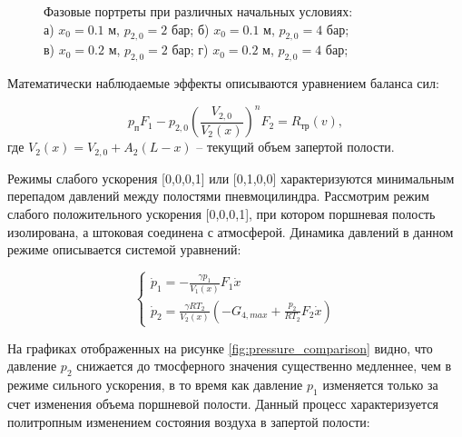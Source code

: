 \begin{figure}[htbp]
	\caption{Фазовые портреты при различных начальных условиях: \\
		а) $x_0 = \num{0,1}$ м, $p_{2,0} = 2$ бар; б) $x_0 = \num{0.1}$ м, $p_{2,0} = 4$ бар; \\
		в) $x_0 = \num{0.2}$ м, $p_{2,0} = 2$ бар; г) $x_0 = \num{0.2}$ м, $p_{2,0} = 4$ бар;
	}
	\label{fig:pp_moderate_matrix}
\end{figure}

Математически наблюдаемые эффекты описываются уравнением баланса сил:

\begin{equation*}
	p_\text{п}F_1 - p_{2,0}\left(\frac{V_{2,0}}{V_2(x)}\right)^nF_2 = R_\text{тр}(v),
\end{equation*}
где $V_2(x) = V_{2,0} + A_2(L - x)$ -- текущий объем запертой полости.

Режимы слабого ускорения [0,0,0,1] или [0,1,0,0] характеризуются минимальным перепадом давлений между
полостями пневмоцилиндра. Рассмотрим режим слабого положительного ускорения [0,0,0,1], при котором поршневая полость
изолирована, а штоковая соединена с атмосферой. Динамика давлений в данном режиме описывается системой уравнений:

$$\begin{cases}
		\dot{p}_1 = -\frac{\gamma p_1}{V_1(x)}F_1\dot{x} \\
		\dot{p}_2 = \frac{\gamma RT_2}{V_2(x)}(-G_{4,max} + \frac{p_2}{RT_2}F_2\dot{x})
	\end{cases}$$

На графиках отображенных на рисунке \ref{fig:pressure_comparison} видно, что давление $p_2$ снижается до
тмосферного значения существенно медленнее, чем в режиме сильного ускорения, в то время как
давление $p_1$ изменяется только за счет изменения объема поршневой полости. Данный процесс
характеризуется политропным изменением состояния воздуха в запертой полости:

